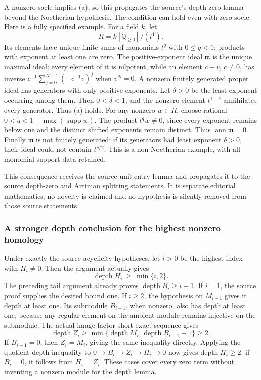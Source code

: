 A nonzero socle implies (a), so this propagates the source's depth-zero lemma beyond the Noetherian hypothesis. The condition can hold even with zero socle. Here is a fully specified example. For a field \(k\), let \[
 R=k[\mathbb Q_{\ge0}]/(t^1).
\] Its elements have unique finite sums of monomials \(t^q\) with \(0\le q<1\); products with exponent at least one are zero. The positive-exponent ideal \(\mathfrak m\) is the unique maximal ideal: every element of it is nilpotent, while an element \(c+v\), \(c\ne0\), has inverse \(c^{-1}\sum_{j=0}^{N-1}(-c^{-1}v)^j\) when \(v^N=0\). A nonzero finitely generated proper ideal has generators with only positive exponents. Let \(\delta>0\) be the least exponent occurring among them. Then \(0<\delta<1\), and the nonzero element \(t^{1-\delta}\) annihilates every generator. Thus (a) holds. For any nonzero \(w\in R\), choose rational \(0<q<1-\max(\operatorname{supp}w)\). The product \(t^qw\ne0\), since every exponent remains below one and the distinct shifted exponents remain distinct. Thus \(\operatorname{ann}\mathfrak m=0\). Finally \(\mathfrak m\) is not finitely generated: if its generators had least exponent \(\delta>0\), their ideal could not contain \(t^{\delta/2}\). This is a non-Noetherian example, with all monomial support data retained.

This consequence receives the source unit-entry lemma and propagates it to the source depth-zero and Artinian splitting statements. It is separate editorial mathematics; no novelty is claimed and no hypothesis is silently removed from those source statements.

\subsubsection{A stronger depth conclusion for the highest nonzero homology}\label{a-stronger-depth-conclusion-for-the-highest-nonzero-homology}

Under exactly the source acyclicity hypotheses, let \(i>0\) be the highest index with \(H_i\ne0\). Then the argument actually gives \[
 \operatorname{depth}H_i\ \ge\ \min\{i,2\}.
\] The preceding tail argument already proves \(\operatorname{depth}B_i\ge i+1\). If \(i=1\), the source proof supplies the desired bound one. If \(i\ge2\), the hypothesis on \(M_{i-1}\) gives it depth at least one. Its submodule \(B_{i-1}\), when nonzero, also has depth at least one, because any regular element on the ambient module remains injective on the submodule. The actual image-factor short exact sequence gives \[
 \operatorname{depth}Z_i\ge
 \min\{\operatorname{depth}M_i,\operatorname{depth}B_{i-1}+1\}\ge2.
\] If \(B_{i-1}=0\), then \(Z_i=M_i\), giving the same inequality directly. Applying the quotient depth inequality to \(0\to B_i\to Z_i\to H_i\to0\) now gives depth \(H_i\ge2\); if \(B_i=0\), it follows from \(H_i=Z_i\). These cases cover every zero term without inventing a nonzero module for the depth lemma.

